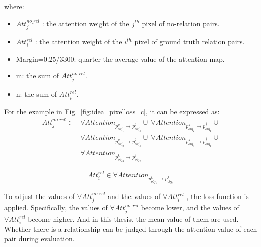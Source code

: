where:
\begin{itemize}
	\item $ Att_j^{no\_rel} $ : the attention weight of the $ j^{th} $ pixel of no-relation pairs.
	\item $ Att_i^{rel} $ :  the attention weight of the $ i^{th} $ pixel of ground truth relation pairs.
	\item Margin=0.25/3300: quarter the average value of the attention map.
	\item m: the sum of $ Att_j^{no\_rel}$.
	\item n: the sum of $ Att_i^{rel} $.
\end{itemize}


For the example in Fig.~\ref{fig:idea_pixelloss_c}, it can be expressed as:
\begin{align*}
	Att_j^{no\_rel} \in & \forall Attention_{p^k_{obj_1} \to p^j_{obj_3}}  \cup \   \forall Attention_{p^k_{obj_2} \to p^j_{obj_1}} \cup \\ 
	& \forall Attention_{p^k_{obj_2} \to p^j_{obj_3}} \cup \ \forall Attention_{p^k_{obj_3} \to p^j_{obj_1}} \cup \\ 
	& \forall Attention_{p^k_{obj_3} \to p^j_{obj_2}}
\end{align*}

\begin{equation*}
	Att_i^{rel} \in  \forall Attention_{p^k_{obj_1} \to p^j_{obj_2}} 
\end{equation*}

To adjust the values of $ \forall Att_j^{no\_rel}  $ and the values of $ \forall Att_i^{rel} $ , the loss function is applied. Specifically, the values of $ \forall Att_j^{no\_rel}  $ become lower, and the values of $ \forall Att_i^{rel} $ become higher. And in this thesis, the mean value of them are used. Whether there is a relationship can be judged through the attention value of each pair during evaluation.

